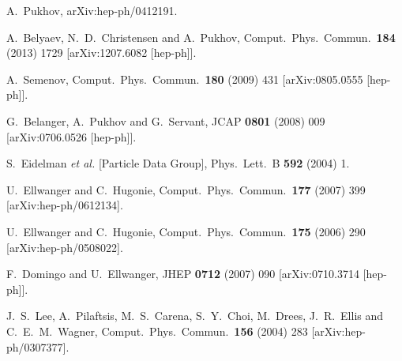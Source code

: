 \documentclass[12pt,a4paper]{article}
\begin{document}
\begin{thebibliography}{}
  A.~Pukhov,
  arXiv:hep-ph/0412191.

   A.~Belyaev, N.~D.~Christensen and A.~Pukhov,
   Comput.\ Phys.\ Commun.\  {\bf 184} (2013) 1729
   [arXiv:1207.6082 [hep-ph]].

  A.~Semenov,
  Comput.\ Phys.\ Commun.\  {\bf 180} (2009) 431
  [arXiv:0805.0555 [hep-ph]].

  G.~Belanger, A.~Pukhov and G.~Servant,
  JCAP {\bf 0801} (2008) 009
  [arXiv:0706.0526 [hep-ph]].

  S.~Eidelman {\it et al.}  [Particle Data Group],
  Phys.\ Lett.\  B {\bf 592} (2004) 1.



  U.~Ellwanger and C.~Hugonie,
  Comput.\ Phys.\ Commun.\  {\bf 177} (2007) 399
  [arXiv:hep-ph/0612134].
  
  U.~Ellwanger and C.~Hugonie,
  Comput.\ Phys.\ Commun.\  {\bf 175} (2006) 290
  [arXiv:hep-ph/0508022].
  
  F.~Domingo and U.~Ellwanger,
  JHEP {\bf 0712} (2007) 090
  [arXiv:0710.3714 [hep-ph]].
  
  
  J.~S.~Lee, A.~Pilaftsis, M.~S.~Carena, S.~Y.~Choi, M.~Drees, J.~R.~Ellis and C.~E.~M.~Wagner,
  Comput.\ Phys.\ Commun.\  {\bf 156} (2004) 283
  [arXiv:hep-ph/0307377].


\end{thebibliography}
\end{document}
